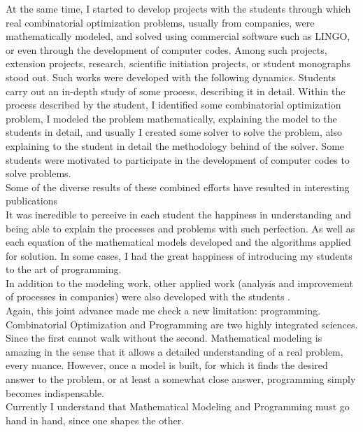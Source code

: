 \documentclass{book}
\begin{document}
At the same time, I started to develop projects with the students through which real combinatorial optimization problems, usually from companies, were mathematically modeled, and solved using commercial software such as LINGO, or even through the development of computer codes. Among such projects, extension projects, research, scientific initiation projects, or student monographs stood out. Such works were developed with the following dynamics. Students carry out an in-depth study of some process, describing it in detail. Within the process described by the student, I identified some combinatorial optimization problem, I modeled the problem mathematically, explaining the model to the students in detail, and usually I created some solver to solve the problem, also explaining to the student in detail the methodology behind of the solver. Some students were motivated to participate in the development of computer codes to solve problems. \\

Some of the diverse results of these combined efforts have resulted in interesting publications \\

It was incredible to perceive in each student the happiness in understanding and being able to explain the processes and problems with such perfection. As well as each equation of the mathematical models developed and the algorithms applied for solution. In some cases, I had the great happiness of introducing my students to the art of programming. \\

In addition to the modeling work, other applied work (analysis and improvement of processes in companies) were also developed with the students \cite{AraujoEtAl2020}. \\

Again, this joint advance made me check a new limitation: programming. Combinatorial Optimization and Programming are two highly integrated sciences. Since the first cannot walk without the second. Mathematical modeling is amazing in the sense that it allows a detailed understanding of a real problem, every nuance. However, once a model is built, for which it finds the desired answer to the problem, or at least a somewhat close answer, programming simply becomes indispensable. \\

Currently I understand that Mathematical Modeling and Programming must go hand in hand, since one shapes the other. \\
\end{document}
